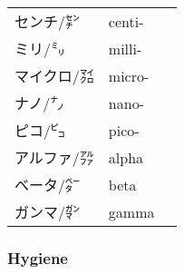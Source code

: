 \documentclass[../nihongo-gakushuu-kyouzai.tex]{subfiles}
\begin{document}
\begin{multicols}{2}
\begin{center}
{\begin{tabular}{@{}lll@{}}
    センチ/㌢ & centi- & \\
    ミリ/㍉ & milli- & \\
    マイクロ/㍃ & micro- & \\
    ナノ/㌨ & nano- & \\
    ピコ/㌰ & pico- & \\
    \midrule
    \midrule
    アルファ/㌁ & alpha & \\
    ベータ/㌼ & beta & \\
    ガンマ/㌏ & gamma & \\
    \bottomrule
\end{tabular}%
}
\label{tbl:appendix-vocab-nouns-physical-units}
\end{center}


\subsubsection{Hygiene}
\begin{center}
\label{tbl:appendix-vocab-nouns-hygiene}
\end{center}

\end{multicols}
\end{document}

